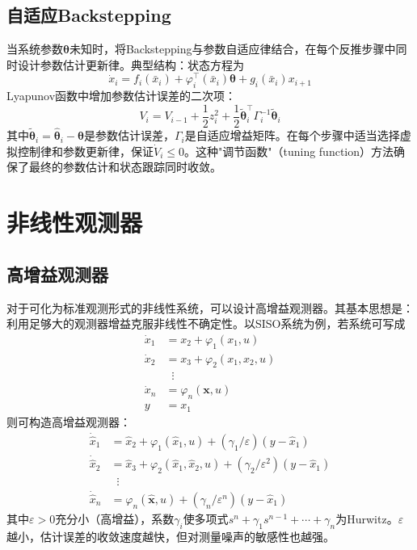 \subsection{自适应Backstepping}

当系统参数$\boldsymbol{\theta}$未知时，将Backstepping与参数自适应律结合，在每个反推步骤中同时设计参数估计更新律。典型结构：状态方程为
\[
\dot{x}_i = f_i(\bar{x}_i) + \varphi_i^{\top}(\bar{x}_i)\boldsymbol{\theta} + g_i(\bar{x}_i)x_{i+1}
\]
Lyapunov函数中增加参数估计误差的二次项：
\[
V_i = V_{i-1} + \frac{1}{2}z_i^2 + \frac{1}{2}\tilde{\boldsymbol{\theta}}_i^{\top}\Gamma_i^{-1}\tilde{\boldsymbol{\theta}}_i
\]
其中$\tilde{\boldsymbol{\theta}}_i = \hat{\boldsymbol{\theta}}_i - \boldsymbol{\theta}$是参数估计误差，$\Gamma_i$是自适应增益矩阵。在每个步骤中适当选择虚拟控制律和参数更新律，保证$\dot{V}_i \le 0$。这种"调节函数"（tuning function）方法确保了最终的参数估计和状态跟踪同时收敛。

\section{非线性观测器}

\subsection{高增益观测器}

对于可化为标准观测形式的非线性系统，可以设计高增益观测器。其基本思想是：利用足够大的观测器增益克服非线性不确定性。以SISO系统为例，若系统可写成
\begin{align*}
\dot{x}_1 &= x_2 + \varphi_1(x_1, u) \\
\dot{x}_2 &= x_3 + \varphi_2(x_1, x_2, u) \\
&\;\;\vdots \\
\dot{x}_n &= \varphi_n(\mathbf{x}, u) \\
y &= x_1
\end{align*}
则可构造高增益观测器：
\begin{align*}
\dot{\hat{x}}_1 &= \hat{x}_2 + \varphi_1(\hat{x}_1, u) + (\gamma_1/\varepsilon)(y - \hat{x}_1) \\
\dot{\hat{x}}_2 &= \hat{x}_3 + \varphi_2(\hat{x}_1, \hat{x}_2, u) + (\gamma_2/\varepsilon^2)(y - \hat{x}_1) \\
&\;\;\vdots \\
\dot{\hat{x}}_n &= \varphi_n(\hat{\mathbf{x}}, u) + (\gamma_n/\varepsilon^n)(y - \hat{x}_1)
\end{align*}
其中$\varepsilon > 0$充分小（高增益），系数$\gamma_i$使多项式$s^n + \gamma_1 s^{n-1} + \cdots + \gamma_n$为Hurwitz。$\varepsilon$越小，估计误差的收敛速度越快，但对测量噪声的敏感性也越强。

